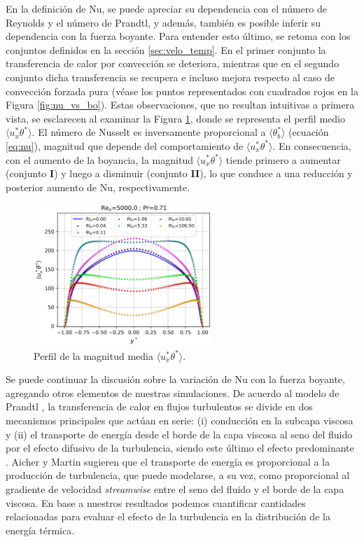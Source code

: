 En la definición de Nu, se puede apreciar su dependencia con el número de Reynolds y el número de Prandtl, y además, también es posible inferir su dependencia con la fuerza boyante. Para entender esto último, se retoma con los conjuntos definidos en la sección \ref{sec:velo_temp}. En el primer conjunto la transferencia de calor por convección se deteriora, mientras que en el segundo conjunto dicha transferencia se recupera e incluso mejora respecto al caso de convección forzada pura (véase los puntos representados con cuadrados rojos en la Figura \ref{fig:nu_vs_bo}). Estas observaciones, que no resultan intuitivas a primera vista, se esclarecen al examinar la Figura \ref{fig:uphi-Re5000-Pr071}, donde se representa el perfil medio $\langle u_x^{*}\theta^{*}\rangle$. El número de Nusselt es inversamente proporcional a $\langle\theta^{*}_b\rangle$ (ecuación \ref{eq:nu}), magnitud que depende del comportamiento de $\langle u_x^{*}\theta^{*}\rangle$. En consecuencia, con el aumento de la boyancia, la magnitud  $\langle u_x^{*}\theta^{*}\rangle$ tiende primero a aumentar (conjunto \textbf{I}) y luego a disminuir (conjunto \textbf{II}), lo que conduce a una reducción y posterior aumento de Nu, respectivamente. 

\begin{figure}[H] %
  \centering
  \includegraphics[width=0.6\textwidth]{figures/cap5/Re5000-Pr071/uxphi_profile.png}  
  \caption{Perfil de la magnitud media $\langle u^{*}_x\theta^{*}\rangle$.}
  \label{fig:uphi-Re5000-Pr071}
\end{figure}


Se puede continuar la discusión sobre la variación de Nu con la fuerza boyante, agregando otros elementos de nuestras simulaciones. De acuerdo al modelo de Prandtl \cite{Prandtl1942}, la transferencia de calor en flujos turbulentos se divide en dos mecanismos principales que actúan en serie: (i) conducción en la subcapa viscosa y (ii) el transporte de energía desde el borde de la capa viscosa al seno del fluido por el efecto difusivo de la turbulencia, siendo este último el efecto predominante \cite{aicher1997, hall1969laminarization}. Aicher y Martin \cite{aicher1997} sugieren que el transporte de energía es proporcional a la producción de turbulencia, que puede modelarse, a su vez, como proporcional al gradiente de velocidad \textit{streamwise} entre el seno del fluido y el borde de la capa viscosa. En base a nuestros resultados podemos cuantificar  cantidades relacionadas para evaluar el efecto de la turbulencia en la distribución de la energía térmica. 


